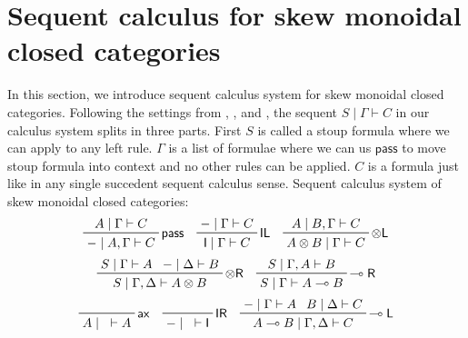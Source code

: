 \documentclass[submission,copyright,creativecommons]{eptcs}
\newcommand{\pass}{\mathsf{pass}}
\begin{document}
\section{Sequent calculus for skew monoidal closed categories}
In this section, we introduce sequent calculus system for skew monoidal closed categories.
Following the settings from \cite{uustalu:sequent:2018}, \cite{uustalu:deductive:nodate}, and \cite{uustalu:proof:nodate}, the sequent $S \mid \Gamma \vdash C$ in our calculus system splits in three parts.
First $S$ is called a stoup formula where we can apply to any left rule.
$\Gamma$ is a list of formulae where we can us $\pass$ to move stoup formula into context and no other rules can be applied.
$C$ is a formula just like in any single succedent sequent calculus sense.
Sequent calculus system of skew monoidal closed categories:
\begin{displaymath}
  \prftree[r]{$\mathsf{pass}$}
  {
  A\mid \Gamma \vdash C
  }
  {
  -\mid A, \Gamma \vdash C
  }
  \quad
  \prftree[r]{$\mathsf{IL}$}
  {
  -\mid \Gamma \vdash C
  }
  {
  \mathsf{I} \mid \Gamma \vdash C
  }
  \quad
  \prftree[r]{$\otimes \mathsf{L}$}
  {
  A\mid B, \Gamma \vdash C
  }
  {
  A\otimes B\mid \Gamma \vdash C
  }
\end{displaymath}
\begin{displaymath}
  \prftree[r]{$\otimes \mathsf{R}$}
  {
  S\mid \Gamma \vdash A
  }
  {
  -\mid \Delta \vdash B
  }
  {
  S\mid \Gamma , \Delta \vdash A\otimes B
  }
  \quad
  \prftree[r]{$\multimap \mathsf{R}$}
  {
  S\mid \Gamma ,A \vdash B
  }
  {
  S\mid \Gamma \vdash A\multimap B
  }
\end{displaymath}
\begin{displaymath}
  \prftree[r]{$\mathsf{ax}$}
  {
  A\mid \text{ } \vdash A
  }
  \quad
  \prftree[r]{$\mathsf{IR}$}
  {}
  {
  -\mid \text{ } \vdash \mathsf{I}
  }
  \quad
  \prftree[r]{$\multimap \mathsf{L}$}
  {
  -\mid \Gamma \vdash A
  }
  {
  B\mid \Delta \vdash C
  }
  {
  A\multimap B \mid \Gamma , \Delta \vdash C
  }
\end{displaymath}
\end{document}
